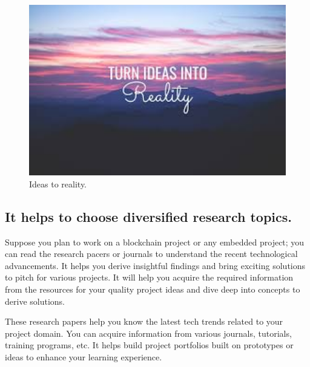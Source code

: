 \begin{figure}[ht]
	\centering
	\includegraphics[width=5in]{figures/ideas_2_reality.jpg}
	\caption{Ideas to reality.  \label{fig:ideas_2_reality}}
\end{figure}

\subsection{It helps to choose diversified research topics.}
Suppose you plan to work on a blockchain project or any embedded project; you can read the research pacers or journals to understand the recent technological advancements. It helps you derive insightful findings and bring exciting solutions to pitch for various projects. It will help you acquire the required information from the resources for your quality project ideas and dive deep into concepts to derive solutions.

These research papers help you know the latest tech trends related to your project domain. You can acquire information from various journals, tutorials, training programs, etc. It helps build project portfolios built on prototypes or ideas to enhance your learning experience.


